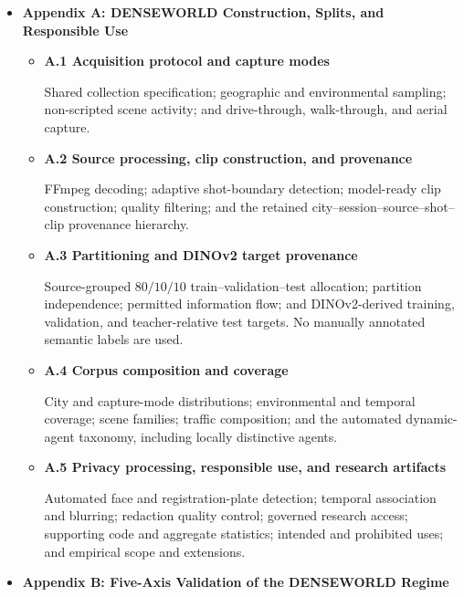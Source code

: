 \begin{itemize}

\item \textbf{Appendix A: DENSEWORLD Construction, Splits, and Responsible Use}
\begin{itemize}

    \item \textbf{A.1 Acquisition protocol and capture modes}
    
    Shared collection specification; geographic and environmental
    sampling; non-scripted scene activity; and drive-through,
    walk-through, and aerial capture.

    \item \textbf{A.2 Source processing, clip construction, and provenance}
    
    FFmpeg decoding; adaptive shot-boundary detection; model-ready clip
    construction; quality filtering; and the retained
    city--session--source--shot--clip provenance hierarchy.

    \item \textbf{A.3 Partitioning and DINOv2 target provenance}
    
    Source-grouped \(80/10/10\) train--validation--test allocation;
    partition independence; permitted information flow; and
    DINOv2-derived training, validation, and teacher-relative test
    targets. No manually annotated semantic labels are used.

    \item \textbf{A.4 Corpus composition and coverage}
    
    City and capture-mode distributions; environmental and temporal
    coverage; scene families; traffic composition; and the automated
    dynamic-agent taxonomy, including locally distinctive agents.

    \item \textbf{A.5 Privacy processing, responsible use, and research artifacts}
    
    Automated face and registration-plate detection; temporal
    association and blurring; redaction quality control; governed
    research access; supporting code and aggregate statistics;
    intended and prohibited uses; and empirical scope and extensions.

\end{itemize}

\item \textbf{Appendix B: Five-Axis Validation of the DENSEWORLD Regime}
\begin{itemize}


\end{itemize}
\end{itemize}
